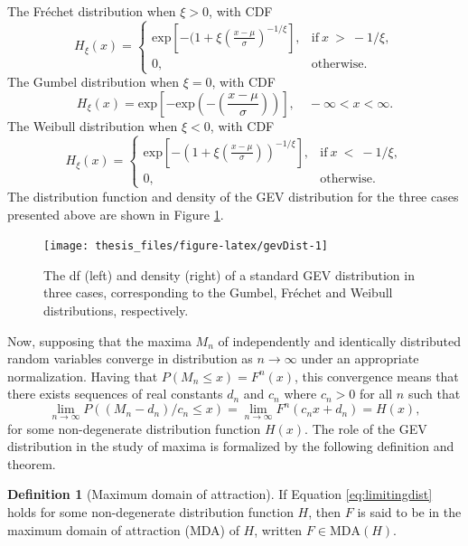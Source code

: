 \documentclass[a4paper,11pt]{article}
\theoremstyle{definition}
\newtheorem{definition}{Definition}[section]
\theoremstyle{definition}
\theoremstyle{definition}
\theoremstyle{definition}
\theoremstyle{remark}
\begin{document}
The Fréchet distribution when \(\xi > 0\), with CDF
\begin{equation}
H_{\xi}(x) = 
\begin{cases}
\text{exp} [ -(1 + \xi(\frac{x-\mu}{\sigma})^{-1/\xi}], & \text{if}\ x \ >\ -1/\xi, \\
0, & \text{otherwise}. 
\end{cases}
\label{eq:Frechet}
\end{equation}
The Gumbel distribution when \(\xi = 0\), with CDF
\begin{equation}
H_{\xi}(x) = \text{exp}[-\text{exp}(-(\frac{x-\mu}{\sigma}))], \quad -\infty < x < \infty.
\label{eq:Gumbel}
\end{equation}
The Weibull distribution when \(\xi < 0\), with CDF
\begin{equation}
H_{\xi}(x) = 
\begin{cases}
\text{exp}[-(1+\xi(\frac{x-\mu}{\sigma}))^{-1/\xi}] , & \text{if}\ x \ <\ -1/\xi, \\
0, & \text{otherwise}. 
\end{cases}
\label{eq:Weibull}
\end{equation}
The distribution function and density of the GEV distribution for the three cases presented above are shown in Figure \ref{fig:gevDist}.
\begin{figure}[H]

{\centering \texttt{[image: thesis\_files/figure-latex/gevDist-1]} 

}

\caption{The df (left) and density (right) of a standard GEV distribution in three cases, corresponding to the Gumbel, Fréchet and Weibull distributions, respectively.}\label{fig:gevDist}
\end{figure}
Now, supposing that the maxima \(M_n\) of independently and identically distributed random variables converge in distribution as \(n \rightarrow \infty\) under an appropriate normalization. Having that \(P(M_n \leq x) = F^{n}(x)\), this convergence means that there exists sequences of real constants \(d_n\) and \(c_n\) where \(c_n > 0\) for all \(n\) such that
\begin{equation}
\lim_{n \to \infty} P((M_n - d_n)/c_n \leq x) = \lim_{n \to \infty} F^{n}(c_{n}x + d_n) = H(x),
\label{eq:limitingdist}
\end{equation}
for some non-degenerate distribution function \(H(x)\). The role of the GEV distribution in the study of maxima is formalized by the following definition and theorem.
\begin{definition}[Maximum domain of attraction]
\protect\hypertarget{def:unnamed-chunk-1}{}{\label{def:unnamed-chunk-1} {} }
If Equation \eqref{eq:limitingdist} holds for some non-degenerate distribution function \(H\), then \(F\) is said to be in the maximum domain of attraction (MDA) of \(H\), written \(F \in \text{MDA}(H)\).
\end{definition}
\end{document}
